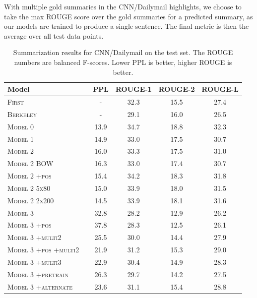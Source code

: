 \documentclass[12pt]{report}
\begin{document}
With multiple gold summaries in the CNN/Dailymail highlights, we choose to take the max ROUGE score over the gold summaries for a predicted summary, as our models are trained to produce a single sentence. The final metric is then the average over all test data points. %



\begin{table}[h]
\centering
\begin{tabular}{llcccc}
 \toprule
 Model &  & PPL & ROUGE-1 & ROUGE-2 & ROUGE-L \\
 \midrule
\textsc{First} & & - & 32.3 & 15.5 & 27.4 \\
\textsc{Berkeley} & & - & 29.1 & 16.0 & 26.5 \\
\midrule
\textsc{Model 0} & & 13.9 & 34.7 & 18.8 & 32.3 \\
\midrule
 \textsc{Model 1} & & 14.9 & 33.0 & 17.5 & 30.7 \\
\midrule
\textsc{Model 2 } & & 16.0 & 33.3 & 17.5 & 31.0 \\
\textsc{Model 2 BOW} & & 16.3 & 33.0 & 17.4 & 30.7 \\
\textsc{Model 2  +pos} & & 15.4 & 34.2 & 18.3 & 31.8 \\
\textsc{Model 2 5x80 } & & 15.0 & 33.9 & 18.0 & 31.5 \\
\textsc{Model 2 2x200 } & & 14.5 & 33.9 & 18.1 & 31.6 \\
\midrule
\textsc{Model 3 } & & 32.8 & 28.2 & 12.9 & 26.2 \\
\textsc{Model 3 +pos} & & 37.8 & 28.3 & 12.5 & 26.1 \\
\textsc{Model 3 +multi2} & & 25.5 & 30.0 & 14.4 & 27.9 \\
\textsc{Model 3 +pos +multi2} & & 21.9 & 31.2 & 15.3 & 29.0 \\
\textsc{Model 3 +multi3} & & 22.9 & 30.4 & 14.9 & 28.3 \\
\textsc{Model 3 +pretrain} & & 26.3 & 29.7 & 14.2 & 27.5\\
\textsc{Model 3 +alternate} & & 23.6 & 31.1 & 15.4 & 28.8 \\
 \bottomrule
\end{tabular}
\caption[CNN/Dailymail Results]{Summarization results for CNN/Dailymail on the test set. The ROUGE numbers are balanced F-scores. Lower PPL is better, higher ROUGE is better.}
\label{table:summary}
\end{table}
\end{document}
